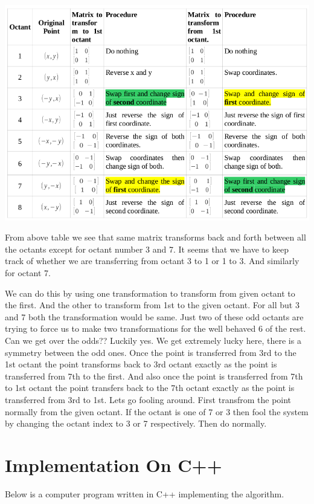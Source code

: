 \documentclass[a4paper,12pt,oneside]{book}
\begin{document}
  
\includegraphics[scale=0.50]{Files/Images/Matrix.png}

From above table we see that same matrix transforms back and forth between all the octants except for octant number 3 and 7. It seems that we have to keep track of whether we are transferring from octant 3 to 1 or 1 to 3. And similarly for octant 7. 

We can do this by using one transformation to transform from given octant to the first. And the other to transform from 1st to the given octant. For all but 3 and 7 both the transformation would be same.  Just two of these odd octants are trying to force us to make two transformations for the well behaved 6 of the rest. Can we get over the odds??
Luckily yes.
We get  extremely lucky here, there is a symmetry between the odd ones. Once the point is transferred from 3rd to the 1st octant the point transforms back to 3rd octant exactly as the point is transferred from 7th to the first. And also once the point is transferred from 7th to 1st octant the point transfers back to the 7th octant exactly as the point is transferred from 3rd to 1st.
Lets go fooling around. First transfrom the point normally from the given octant. If the octant is one of 7 or 3 then fool the system by changing the octant index  to 3 or 7 respectively. Then do normally.

\section{Implementation On C++}
Below is a computer program written in C++ implementing the algorithm.

\begin{scriptsize}
	
\end{scriptsize}
\end{document}
